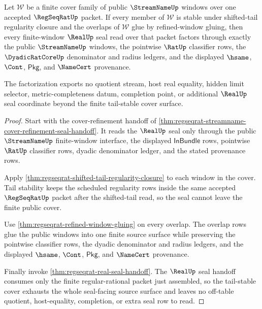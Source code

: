\begin{theorem}
\label{thm:regseqrat-tail-stable-window-cover-exhaustion}
Let $\mathcal W$ be a finite cover family of public $\StreamNameUp$ windows
over one accepted $\RegSeqRatUp$ packet. If every member of $\mathcal W$ is
stable under shifted-tail regularity closure and the overlaps of
$\mathcal W$ glue by refined-window gluing, then every finite-window
$\RealUp$ seal read over that packet factors through exactly the public
$\StreamNameUp$ windows, the pointwise $\RatUp$ classifier rows, the
$\DyadicRatCoreUp$ denominator and radius ledgers, and the displayed
$\hsame$, $\Cont$, $\mathsf{Pkg}$, and $\NameCert$ provenance.

The factorization exports no quotient stream, host real equality, hidden
limit selector, metric-completeness datum, completion point, or additional
$\RealUp$ seal coordinate beyond the finite tail-stable cover surface.
\end{theorem}
\begin{proof}
Start with the cover-refinement handoff of
\autoref{thm:regseqrat-streamname-cover-refinement-seal-handoff}. It reads the
$\RealUp$ seal only through the public $\StreamNameUp$ finite-window
interface, the displayed $\mathsf{InBundle}$ rows, pointwise $\RatUp$
classifier rows, dyadic denominator ledger, and the stated provenance rows.

Apply \autoref{thm:regseqrat-shifted-tail-regularity-closure} to each window
in the cover. Tail stability keeps the scheduled regularity rows inside the
same accepted $\RegSeqRatUp$ packet after the shifted-tail read, so the seal
cannot leave the finite public cover.

Use \autoref{thm:regseqrat-refined-window-gluing} on every overlap. The
overlap rows glue the public windows into one finite source surface while
preserving the pointwise classifier rows, the dyadic denominator and radius
ledgers, and the displayed $\hsame$, $\Cont$, $\mathsf{Pkg}$, and $\NameCert$
provenance.

Finally invoke \autoref{thm:regseqrat-real-seal-handoff}. The $\RealUp$ seal
handoff consumes only the finite regular-rational packet just assembled, so
the tail-stable cover exhausts the whole seal-facing source surface and
leaves no off-table quotient, host-equality, completion, or extra seal row to
read.
\end{proof}
